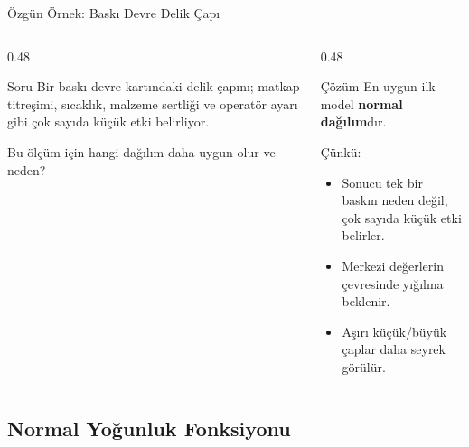 \documentclass[light]{lutbeamer}
\begin{document}
\begin{frame}{Özgün Örnek: Baskı Devre Delik Çapı}
\small
\begin{columns}[T,onlytextwidth]
    \begin{column}{0.48\textwidth}
        \begin{block}{Soru}
            Bir baskı devre kartındaki delik çapını; matkap titreşimi, sıcaklık, malzeme sertliği ve operatör ayarı gibi çok sayıda küçük etki belirliyor.

            \vspace{0.15cm}
            Bu ölçüm için hangi dağılım daha uygun olur ve neden?
        \end{block}
    \end{column}
    \begin{column}{0.48\textwidth}
        \begin{exampleblock}{Çözüm}
            En uygun ilk model \textbf{normal dağılım}dır.

            \vspace{0.15cm}
            Çünkü:
            \begin{itemize}
                \item Sonucu tek bir baskın neden değil, çok sayıda küçük etki belirler.
                \item Merkezi değerlerin çevresinde yığılma beklenir.
                \item Aşırı küçük/büyük çaplar daha seyrek görülür.
            \end{itemize}
        \end{exampleblock}
    \end{column}
\end{columns}
\end{frame}

\subsection{Normal Yoğunluk Fonksiyonu}
\end{document}
